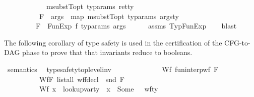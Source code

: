 \begin{isabellebody}
\ \ \ \ \ \ \ \ \ \ {\isachardoublequoteopen}{\isasymtau}\ {\isacharequal}{\kern0pt}\ {\isacharparenleft}{\kern0pt}msubstT{\isacharunderscore}{\kern0pt}opt\ ty{\isacharunderscore}{\kern0pt}params\ ret{\isacharunderscore}{\kern0pt}ty{\isacharparenright}{\kern0pt}{\isachardoublequoteclose}\ \isanewline
\ \ \ \ \ \ \ \ \ \ {\isachardoublequoteopen}F{\isacharcomma}{\kern0pt}{\isasymDelta}\ {\isasymturnstile}\ args\ {\isacharbrackleft}{\kern0pt}{\isacharcolon}{\kern0pt}{\isacharbrackright}{\kern0pt}\ {\isacharparenleft}{\kern0pt}map\ {\isacharparenleft}{\kern0pt}msubstT{\isacharunderscore}{\kern0pt}opt\ ty{\isacharunderscore}{\kern0pt}params{\isacharparenright}{\kern0pt}\ args{\isacharunderscore}{\kern0pt}ty{\isacharparenright}{\kern0pt}{\isachardoublequoteclose}\isanewline
\ \ \ \ \ \ \ \ \ {\isachardoublequoteopen}F{\isacharcomma}{\kern0pt}{\isasymDelta}\ {\isasymturnstile}\ FunExp\ f\ ty{\isacharunderscore}{\kern0pt}params\ args\ {\isacharcolon}{\kern0pt}\ {\isasymtau}{\isachardoublequoteclose}\isanewline
%
\isadelimproof
\ \ %
\endisadelimproof
%
\isatagproof
{}\isamarkupfalse%
\ assms\ TypFunExp\isanewline
\ \ \isamarkupfalse%
\ blast%
\endisatagproof
{\isafoldproof}%
%
\isadelimproof
%
\endisadelimproof
%
\begin{isamarkuptext}%
The following corollary of type safety is used in the certification of the CFG-to-DAG phase 
to prove that that invariants reduce to booleans.%
\end{isamarkuptext}\isamarkuptrue%
\isamarkupfalse%
\ semantics\ \isanewline
\isanewline
{}\isamarkupfalse%
\ type{\isacharunderscore}{\kern0pt}safety{\isacharunderscore}{\kern0pt}top{\isacharunderscore}{\kern0pt}level{\isacharunderscore}{\kern0pt}inv{\isacharcolon}{\kern0pt}\isanewline
\ \ \ \isanewline
\ \ \ \ \ \ \ \ \ \ Wf{\isacharunderscore}{\kern0pt}{\isasymGamma}{\isacharcolon}{\kern0pt}\ {\isachardoublequoteopen}fun{\isacharunderscore}{\kern0pt}interp{\isacharunderscore}{\kern0pt}wf\ F\ {\isasymGamma}{\isachardoublequoteclose}\ \isanewline
\ \ \ \ \ \ \ \ \ \ Wf{\isacharunderscore}{\kern0pt}F{\isacharcolon}{\kern0pt}\ {\isachardoublequoteopen}list{\isacharunderscore}{\kern0pt}all\ {\isacharparenleft}{\kern0pt}wf{\isacharunderscore}{\kern0pt}fdecl\ {\isasymcirc}\ snd{\isacharparenright}{\kern0pt}\ F{\isachardoublequoteclose}\ \isanewline
\ \ \ \ \ \ \ \ \ \ Wf{\isacharunderscore}{\kern0pt}{\isasymLambda}{\isacharcolon}{\kern0pt}\ {\isachardoublequoteopen}{\isasymforall}x\ {\isasymtau}{\isachardot}{\kern0pt}\ lookup{\isacharunderscore}{\kern0pt}var{\isacharunderscore}{\kern0pt}ty\ {\isasymLambda}\ x\ {\isacharequal}{\kern0pt}\ Some\ {\isasymtau}\ {\isasymlongrightarrow}\ wf{\isacharunderscore}{\kern0pt}ty\ {}\ {\isasymtau}{\isachardoublequoteclose}\ \ \ \ \ \isanewline

\end{isabellebody}
